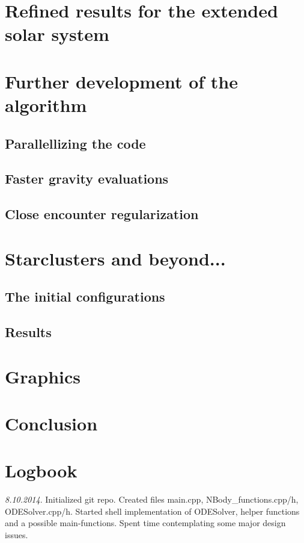 \documentclass[11pt, oneside]{article}   	%
\begin{document}
\section{Refined results for the extended solar system}

\section{Further development of the algorithm}
\subsection{Parallellizing the code}
\subsection{Faster gravity evaluations}
\subsection{Close encounter regularization}

\section{Starclusters and beyond...}
\subsection{The initial configurations}
\subsection{Results}

\section{Graphics}

\section{Conclusion}



\newpage
\section{Logbook}

\emph{8.10.2014}. 
Initialized git repo. Created files main.cpp, NBody\_functions.cpp/h, ODESolver.cpp/h. Started shell implementation of ODESolver, helper functions and a possible main-functions. Spent time contemplating some major design issues.
\end{document}
